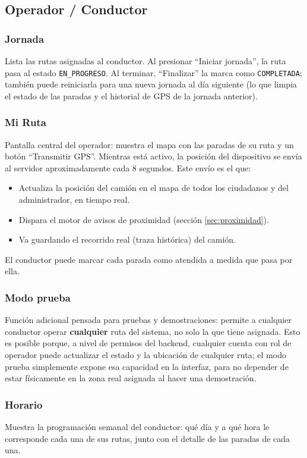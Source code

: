 \documentclass[11pt,a4paper]{article}
\begin{document}
\subsection{Operador / Conductor}

\subsubsection{Jornada}
Lista las rutas asignadas al conductor. Al presionar ``Iniciar jornada'', la ruta pasa al estado \texttt{EN\_PROGRESO}. Al terminar, ``Finalizar'' la marca como \texttt{COMPLETADA}; también puede reiniciarla para una nueva jornada al día siguiente (lo que limpia el estado de las paradas y el historial de GPS de la jornada anterior).

\subsubsection{Mi Ruta}
Pantalla central del operador: muestra el mapa con las paradas de su ruta y un botón ``Transmitir GPS''. Mientras está activo, la posición del dispositivo se envía al servidor aproximadamente cada 8 segundos. Este envío es el que:
\begin{itemize}
    \item Actualiza la posición del camión en el mapa de todos los ciudadanos y del administrador, en tiempo real.
    \item Dispara el motor de avisos de proximidad (sección \ref{sec:proximidad}).
    \item Va guardando el recorrido real (traza histórica) del camión.
\end{itemize}
El conductor puede marcar cada parada como atendida a medida que pasa por ella.

\subsubsection{Modo prueba}
Función adicional pensada para pruebas y demostraciones: permite a cualquier conductor operar \textbf{cualquier} ruta del sistema, no solo la que tiene asignada. Esto es posible porque, a nivel de permisos del backend, cualquier cuenta con rol de operador puede actualizar el estado y la ubicación de cualquier ruta; el modo prueba simplemente expone esa capacidad en la interfaz, para no depender de estar físicamente en la zona real asignada al hacer una demostración.

\subsubsection{Horario}
Muestra la programación semanal del conductor: qué día y a qué hora le corresponde cada una de sus rutas, junto con el detalle de las paradas de cada una.
\end{document}

